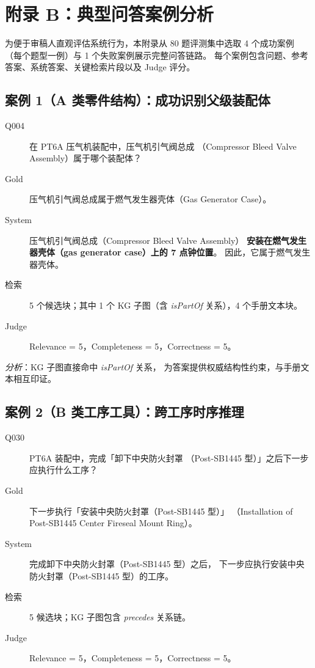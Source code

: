 \section{附录 B：典型问答案例分析}
\label{appendix:cases}

为便于审稿人直观评估系统行为，本附录从 80 题评测集中选取 4 个成功案例
（每个题型一例）与 1 个失败案例展示完整问答链路。
每个案例包含问题、参考答案、系统答案、关键检索片段以及 Judge 评分。

\subsection{案例 1（A 类零件结构）：成功识别父级装配体}

\begin{description}
  \item[\textnormal{Q004}] 在 PT6A 压气机装配中，压气机引气阀总成
        （Compressor Bleed Valve Assembly）属于哪个装配体？
  \item[\textnormal{Gold}] 压气机引气阀总成属于燃气发生器壳体（Gas Generator Case）。
  \item[\textnormal{System}] 压气机引气阀总成（Compressor Bleed Valve Assembly）
        \textbf{安装在燃气发生器壳体（gas generator case）上的 7 点钟位置}。
        因此，它属于燃气发生器壳体。
  \item[\textnormal{检索}] 5 个候选块；其中 1 个 KG 子图（含
        \textit{isPartOf} 关系），4 个手册文本块。
  \item[\textnormal{Judge}] Relevance = 5，Completeness = 5，Correctness = 5。
\end{description}

\textit{分析}：KG 子图直接命中 \textit{isPartOf} 关系，
为答案提供权威结构性约束，与手册文本相互印证。

\subsection{案例 2（B 类工序工具）：跨工序时序推理}

\begin{description}
  \item[\textnormal{Q030}] PT6A 装配中，完成「卸下中央防火封罩
        （Post-SB1445 型）」之后下一步应执行什么工序？
  \item[\textnormal{Gold}] 下一步执行「安装中央防火封罩（Post-SB1445 型）」
        （Installation of Post-SB1445 Center Fireseal Mount Ring）。
  \item[\textnormal{System}] 完成卸下中央防火封罩（Post-SB1445 型）之后，
        下一步应执行安装中央防火封罩（Post-SB1445 型）的工序。
  \item[\textnormal{检索}] 5 候选块；KG 子图包含 \textit{precedes} 关系链。
  \item[\textnormal{Judge}] Relevance = 5，Completeness = 5，Correctness = 5。
\end{description}

